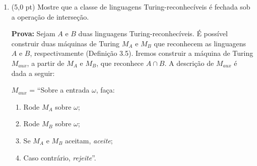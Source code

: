 \documentclass[12pt,a4paper,oneside]{article}
\begin{document}
\begin{enumerate}
		Mostre que a classe de linguagens decidíveis é fechada sob a operação de ou-exclusivo.

		\vspace{0.3cm}
		
		{\color{verde}	
				{\bf Prova:} Sejam $A$ e $B$ duas linguagens decidíveis. É possível construir duas máquinas de Turing $M_A$ e $M_B$ que decidem as linguagens $A$ e $B$, respectivamente (Definição 3.6). Iremos construir a máquina de Turing $M_{aux}$, a partir de $M_A$ e $M_B$, que decide $A \otimes B$. A descrição de $M_{aux}$ é dada a seguir:
			
			$M_{aux}$ = ``Sobre a entrada $\omega$, faça:
			\begin{enumerate}
				\item Rode $M_A$ sobre $\omega$; 
				\item Rode $M_B$ sobre $\omega$; 
				\item Se $M_A$ rejeita e $M_B$ aceita, {\it aceite};
				\item Se $M_A$ aceita e $M_B$ rejeita, {\it aceite};
				\item {\it Rejeite}.''.
			\end{enumerate}
			
			Como foi possível construir $M_{aux}$, então $A \otimes B$ é decidível. Ora, se $A \otimes B$ é decidível, então a classe de linguagens decidíveis é fechada sob a operação de ou-exclusivo $\blacksquare$
			}
			
			\newpage
		
	
	\section*{Segundo Teste}
	
	\item (5,0 pt) Mostre que a classe de linguagens Turing-reconhecíveis é fechada sob a operação de interseção.
	
	\vspace{0.3cm}
		
		{\color{verde}	
				{\bf Prova:} Sejam $A$ e $B$ duas linguagens Turing-reconhecíveis. É possível construir duas máquinas de Turing $M_A$ e $M_B$ que reconhecem as linguagens $A$ e $B$, respectivamente (Definição 3.5). Iremos construir a máquina de Turing $M_{aux}$, a partir de $M_A$ e $M_B$, que reconhece $A \cap B$. A descrição de $M_{aux}$ é dada a seguir:
			
			$M_{aux}$ = ``Sobre a entrada $\omega$, faça:
			\begin{enumerate}
				\item Rode $M_A$ sobre $\omega$; 
				\item Rode $M_B$ sobre $\omega$; 
				\item Se $M_A$ e $M_B$ aceitam, {\it aceite};
				\item Caso contrário, {\it rejeite}''.
			\end{enumerate}
			
}
\end{enumerate}
\end{document}

